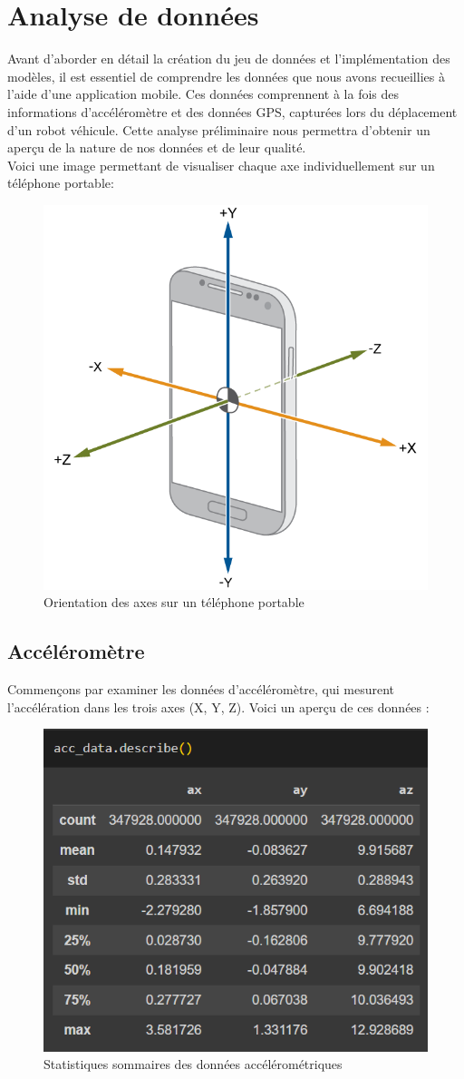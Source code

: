 \section{Analyse de données}
Avant d'aborder en détail la création du jeu de données et l'implémentation des modèles, il est essentiel de comprendre les données que nous avons recueillies à l'aide d'une application mobile. Ces données comprennent à la fois des informations d'accéléromètre et des données GPS, capturées lors du déplacement d'un robot véhicule. Cette analyse préliminaire nous permettra d'obtenir un aperçu de la nature de nos données et de leur qualité.\\

\noindent Voici une image permettant de visualiser chaque axe individuellement sur un téléphone portable:

\begin{figure}[h]
    \centering
    \includegraphics[width=0.4\linewidth]{img/orientation_tel.png}
    \caption{Orientation des axes sur un téléphone portable}
    \label{orientation_axes}
\end{figure}

\subsection{Accéléromètre}
Commençons par examiner les données d'accéléromètre, qui mesurent l'accélération dans les trois axes (X, Y, Z). Voici un aperçu de ces données :

\begin{figure}[h]
    \centering
    \includegraphics[width=0.4\linewidth]{img/accdata.png}
    \caption{Statistiques sommaires des données accélérométriques}
    \label{acceleration_stats}
\end{figure}

